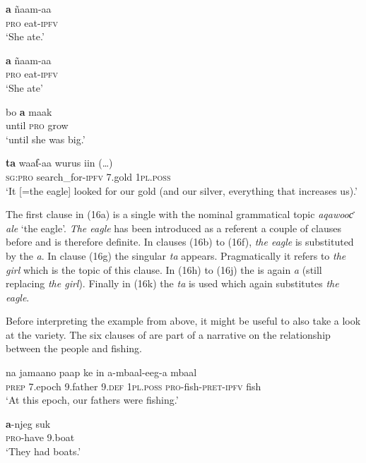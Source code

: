 \documentclass[output=paper
,newtxmath
,modfonts
,nonflat]{langsci/langscibook}
\begin{document}
\ex\label{ex:apel:16h}
\gll \textbf{a} ñaam-aa \\
     \textsc{pro} eat\textsc{-ipfv}\\
\glt ‘She ate.’


\ex\label{ex:apel:16i}
\gll \textbf{a} ñaam-aa\\
     \textsc{pro} eat\textsc{-ipfv}\\
\glt ‘She ate’


\ex\label{ex:apel:16j}
\gll bo \textbf{a} maak\\
     until \textsc{pro} grow\\
\glt ‘until she was big.’


\ex\label{ex:apel:16k}
\gll \textbf{ta} waaƭ-aa wurus iin (…)\\
     \textsc{sg:pro} search\textsc{\_}for\textsc{-ipfv} \textsc{7.}gold \textsc{1pl.poss}\\
\glt ‘It [=the eagle] looked for our gold (and our silver, everything that increases us).’
\z
\z

The first clause in (16a) is a single  with the nominal grammatical  topic \textit{aqawooƈ ale} ‘the eagle’. \textit{The eagle} has been introduced as a referent a couple of clauses before and is therefore definite. In clauses (16b) to (16f), \textit{the eagle} is substituted by the  \textit{a}. In clause (16g) the singular  \textit{ta} appears. Pragmatically it refers to \textit{the girl} which is the topic of this clause. In (16h) to (16j) the  is again \textit{a} (still replacing \textit{the girl}). Finally in (16k) the  \textit{ta} is used which again substitutes \textit{the eagle}.

Before interpreting the example from  above, it might be useful to also take a look at the  variety. The six clauses of  are part of a narrative on the relationship between the  people and fishing.


\ea\label{ex:apel:17}
{  \citep[356]{Renaudier2012}}
\ea
\gll   na jamaano paap ke in a-mbaal-eeg-a mbaal\\
     \textsc{prep} 7.epoch 9.father 9.\textsc{def} \textsc{1pl.poss} \textsc{pro}-fish-\textsc{pret-ipfv} fish\\
\glt ‘At this epoch, our fathers were fishing.’
 

\ex
\gll \textbf{a}-njeg suk\\
     \textsc{pro}-have \textsc{9.}boat \\
\glt ‘They had boats.’
 
\end{document}
